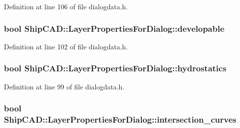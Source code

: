 Definition at line 106 of file dialogdata.\+h.

\subsubsection[{\texorpdfstring{developable}{developable}}]{\setlength{\rightskip}{0pt plus 5cm}bool Ship\+C\+A\+D\+::\+Layer\+Properties\+For\+Dialog\+::developable}\hypertarget{structShipCAD_1_1LayerPropertiesForDialog_ab2610addf8f227b9b9f00e9f275f6342}{}\label{structShipCAD_1_1LayerPropertiesForDialog_ab2610addf8f227b9b9f00e9f275f6342}


Definition at line 102 of file dialogdata.\+h.

\subsubsection[{\texorpdfstring{hydrostatics}{hydrostatics}}]{\setlength{\rightskip}{0pt plus 5cm}bool Ship\+C\+A\+D\+::\+Layer\+Properties\+For\+Dialog\+::hydrostatics}\hypertarget{structShipCAD_1_1LayerPropertiesForDialog_a2ac6ce1339e9dfc028016c5bacea3cae}{}\label{structShipCAD_1_1LayerPropertiesForDialog_a2ac6ce1339e9dfc028016c5bacea3cae}


Definition at line 99 of file dialogdata.\+h.

\subsubsection[{\texorpdfstring{intersection\+\_\+curves}{intersection_curves}}]{\setlength{\rightskip}{0pt plus 5cm}bool Ship\+C\+A\+D\+::\+Layer\+Properties\+For\+Dialog\+::intersection\+\_\+curves}\hypertarget{structShipCAD_1_1LayerPropertiesForDialog_a6003cb18c39e66df709658c14203d066}{}\label{structShipCAD_1_1LayerPropertiesForDialog_a6003cb18c39e66df709658c14203d066}


